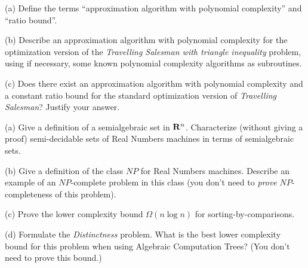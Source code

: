 \documentclass{exam}
\begin{document}
\begin{question}
\begin{roster}
\item[(a)]
Define the terms ``approximation algorithm with polynomial complexity'' and ``ratio bound''.
\item[(b)]
Describe an approximation algorithm with polynomial complexity for the optimization
version of the {\em Travelling Salesman with triangle inequality} problem, using if necessary,
some known polynomial complexity algorithms as subroutines.
\item[(c)]
Does there exist an approximation algorithm with polynomial complexity and a constant
ratio bound for the standard optimization version of {\em Travelling Salesman}?
Justify your answer.
\end{roster}
\end{question}

\begin{question}
\begin{roster}
\item[(a)]
Give a definition of a semialgebraic set in ${\bf R}^n$.
Characterize (without giving a proof) semi-decidable sets of Real Numbers machines in terms of
semialgebraic sets.
\item[(b)]
Give a definition of the class $NP$ for Real Numbers machines.
Describe an example of an $NP$-complete problem in this class (you don't need to {\em prove}
$NP$-completeness of this problem).
\item[(c)]
Prove the lower complexity bound $\Omega(n \log n)$ for sorting-by-comparisons.
\item[(d)]
Formulate the {\em Distinctness} problem.
What is the best lower complexity bound for this problem when using Algebraic Computation Trees?
(You don't need to prove this bound.)
\end{roster}
\end{question}

\end{document}
